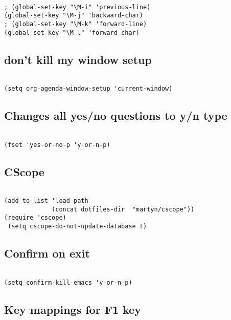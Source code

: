 \documentclass[colorlinks=true,urlcolor=blue,listings-sv]{article}
\begin{document}
\lstset{language=Lisp}
\begin{lstlisting}

; (global-set-key "\M-i" 'previous-line)
(global-set-key "\M-j" 'backward-char)
; (global-set-key "\M-k" 'forward-line)
(global-set-key "\M-l" 'forward-char)
\end{lstlisting}
\subsection{don't kill my window setup}
\label{sec-1-5}



\lstset{language=Lisp}
\begin{lstlisting}

(setq org-agenda-window-setup 'current-window)
\end{lstlisting}
\subsection{Changes all yes/no questions to y/n type}
\label{sec-1-6}



\lstset{language=Lisp}
\begin{lstlisting}

(fset 'yes-or-no-p 'y-or-n-p)
\end{lstlisting}
\subsection{CScope}
\label{sec-1-7}



\lstset{language=Lisp}
\begin{lstlisting}

(add-to-list 'load-path
             (concat dotfiles-dir  "martyn/cscope"))
(require 'cscope)
 (setq cscope-do-not-update-database t)
\end{lstlisting}
\subsection{Confirm on exit}
\label{sec-1-8}



\lstset{language=Lisp}
\begin{lstlisting}

(setq confirm-kill-emacs 'y-or-n-p)
\end{lstlisting}
\subsection{Key mappings for F1 key}
\label{sec-1-9}
\end{document}
